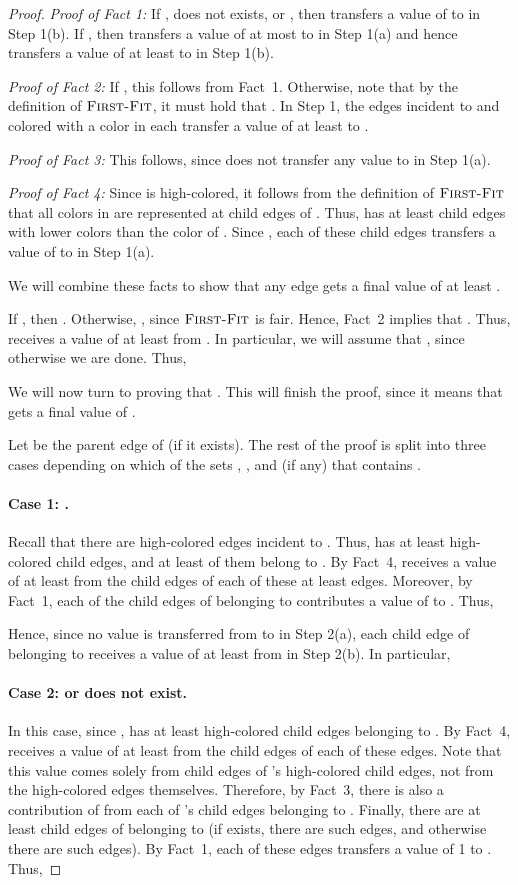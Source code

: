 \documentclass[smallextended]{svjour3}
\newcommand{\FF}{\ensuremath{\operatorname{\textsc{First-Fit}}}\xspace}
\begin{document}
\begin{proof}
{\em Proof of Fact 1:}
If ,  does not exists, or , then  transfers a value of  to  in Step 1(b). If , then  transfers a value of at most  to  in Step 1(a) and hence  transfers a value of at least  to  in Step 1(b).

{\em 
Proof of Fact 2:}
If , this follows from Fact~1. Otherwise, note that by the definition of \FF, it must hold that . In Step 1, the edges incident to  and  colored with a color in  each transfer a value of at least  to .

{\em Proof of Fact 3:} This follows, since  does not transfer any value to  in Step 1(a).

{\em Proof of Fact 4:}
Since  is high-colored, it follows from the definition of \FF that
 all colors in  are represented at child edges of .
Thus,  has at least  child
 edges with lower colors than the color of .
Since , each of these child edges transfers a value of 
 to  in Step 1(a).

We will combine these facts to show that any edge  gets a final value of at least . 

If , then .
Otherwise, , since \FF is fair.
Hence, Fact~2 implies that . 
Thus,  receives a value of at least  from . 
In particular, we will assume that , since otherwise we are
 done. 
Thus, 

We will now turn to proving that .
This will finish the proof, since it
 means that  gets a final value of
 .

Let  be the parent edge of  (if it exists). The rest of the proof is split into three cases depending on which of the sets , , and  (if any) that contains .

\paragraph{Case 1: .}
Recall that there are  high-colored edges incident to .
Thus,  has at least  high-colored child edges, and at
 least  of them belong to .
By Fact~4,  receives a value of at least  from
 the child edges of each of these at least  edges.
Moreover, by Fact~1, each of the  child edges of 
 belonging to  contributes a value of  to .
Thus, 

Hence, since no value is transferred from  to  in Step 2(a), each child edge of  belonging to  receives a value of at least  from  in Step 2(b).
In particular, 


\paragraph{Case 2:  or  does not exist.}
In this case, since ,  has at least
  high-colored child edges belonging to .
By Fact~4,  receives a value of at least  from
 the child edges of each of these edges.
Note that this value comes solely from child edges of 's
high-colored child edges, not from the high-colored edges
 themselves. 
Therefore, by Fact~3, there is also a contribution of
  from each of 's child edges belonging to .
Finally, there are at least  child edges of  belonging to  (if  exists, there are  such edges, and otherwise there are  such edges). By Fact~1, each of these edges transfers a value of 1 to . Thus, 


\end{proof}
\end{document}
